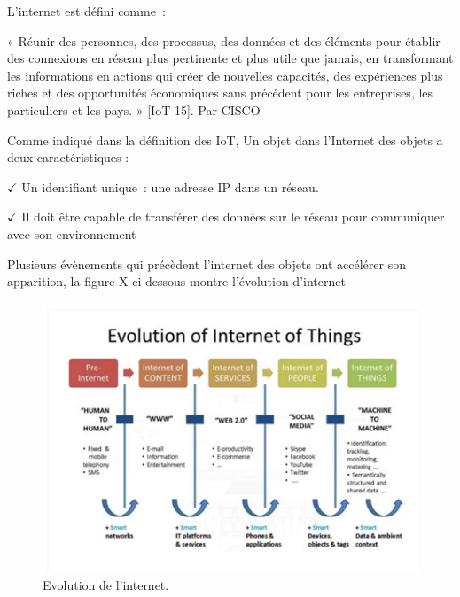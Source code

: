 \documentclass[12pt,a4paper]{report}
\begin{document}
\begin{flushleft}
\begin{figure}[H]
	\end{figure}

	
	\noindent 
	
	\noindent L'internet est d\'{e}fini comme~:
	
	\noindent 
	
	\noindent « R\'{e}unir des personnes, des processus, des donn\'{e}es et des \'{e}l\'{e}ments pour \'{e}tablir des connexions en r\'{e}seau plus pertinente et plus utile que jamais, en transformant les informations en actions qui cr\'{e}er de nouvelles capacit\'{e}s, des exp\'{e}riences plus riches et des opportunit\'{e}s \'{e}conomiques sans pr\'{e}c\'{e}dent pour les entreprises, les particuliers et les pays. » [IoT 15]. Par CISCO
	
	\noindent 
	
	\noindent 
	
	\noindent 
	
	\noindent Comme indiqu\'{e} dans la d\'{e}finition des IoT, Un objet dans l'Internet des objets a deux caract\'{e}ristiques : 
	
	\noindent $\mathrm{\checkmark}$ Un identifiant unique~: une adresse IP dans un r\'{e}seau. 
	
	\noindent $\mathrm{\checkmark}$ Il doit \^{e}tre capable de transf\'{e}rer des donn\'{e}es sur le r\'{e}seau pour communiquer avec son environnement
	
	\noindent 
	
	\noindent 
	
	\noindent 
	
	
	
	\noindent 
	
	\noindent Plusieurs \'{e}v\`{e}nements qui pr\'{e}c\`{e}dent l'internet des objets ont acc\'{e}l\'{e}rer son apparition, la figure X ci-dessous montre l'\'{e}volution d'internet 
	
	\noindent 
	
	\begin{figure}[H]
		\centering
		\includegraphics[width=0.8\linewidth]{image32}
		\caption{Evolution de l'internet.}


\end{figure}
\end{flushleft}
\end{document}
